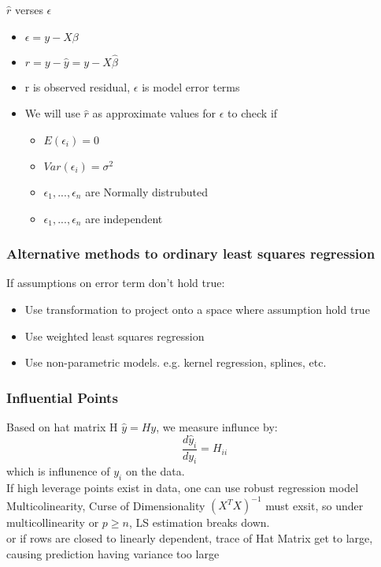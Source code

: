 \documentclass[10pt]{article}
\theoremstyle{break}
\begin{document}
            {\Large$\hat{r}$ verses $\epsilon$}
            \begin{itemize}
                \item $\epsilon=y-X\beta$
                \item $r=y-\hat{y}=y-X\hat{\beta}$
                \item r is observed residual, $\epsilon$ is model error terms
                \item We will use $\hat{r}$ as approximate values for $\epsilon$ to check if\begin{itemize}
                    \item $E(\epsilon_i)=0$
                    \item $Var(\epsilon_i)=\sigma^2$
                    \item $\epsilon_1, ..., \epsilon_n$ are Normally distrubuted
                    \item $\epsilon_1, ..., \epsilon_n$ are independent
                \end{itemize}
            \end{itemize}


        \subsubsection{Alternative methods to ordinary least squares regression}
            If assumptions on error term don't hold true:
            \begin{itemize}
                \item Use transformation to project onto a space where assumption hold true
                \item Use weighted least squares regression
                \item Use non-parametric models. e.g. kernel regression, splines, etc.
            \end{itemize}
        \subsubsection{Influential Points}
            Based on hat matrix H $\hat{y}=Hy$, we measure influnce by:
            $$\frac{d\hat{y}_i}{dy_i}=H_{ii}$$
            which is influnence of $y_i$ on the data.\\If high leverage points exist in data, one can use robust regression model\\
            Multicolinearity, Curse of Dimensionality
            $(X^TX)^{-1}$ must exsit, so under multicollinearity or $p \geq n$, LS estimation breaks down.
            \\or if rows are closed to linearly dependent, trace of Hat Matrix get to large, causing prediction having variance too large
\end{document}
